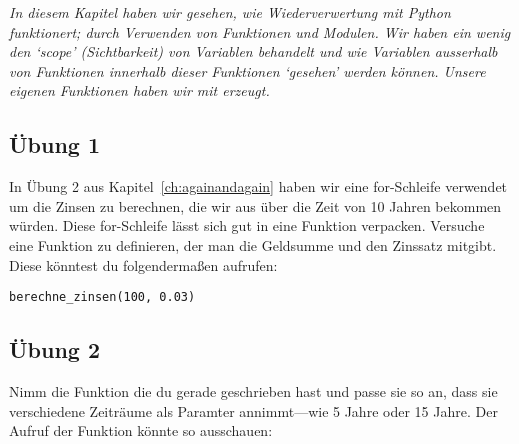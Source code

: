 \emph{In diesem Kapitel haben wir gesehen, wie Wiederverwertung mit Python funktionert; durch Verwenden von Funktionen und Modulen. Wir haben ein wenig den `scope' (Sichtbarkeit) von Variablen behandelt und wie Variablen ausserhalb von Funktionen innerhalb dieser Funktionen `gesehen' werden können. Unsere eigenen Funktionen haben wir mit  erzeugt.}

\subsection*{Übung 1}
In Übung 2 aus Kapitel~\ref{ch:againandagain} haben wir eine for-Schleife verwendet um die Zinsen zu berechnen, die wir aus  über die Zeit von 10 Jahren bekommen würden. Diese for-Schleife lässt sich gut in eine Funktion verpacken. Versuche eine Funktion zu definieren, der man die Geldsumme und den Zinssatz mitgibt. Diese könntest du folgendermaßen aufrufen:

\begin{Verbatim}[frame=single]
berechne_zinsen(100, 0.03)
\end{Verbatim}

\subsection*{Übung 2}
Nimm die Funktion die du gerade geschrieben hast und passe sie so an, dass sie verschiedene Zeiträume als Paramter annimmt---wie 5 Jahre oder 15 Jahre. Der Aufruf der Funktion könnte so ausschauen:

